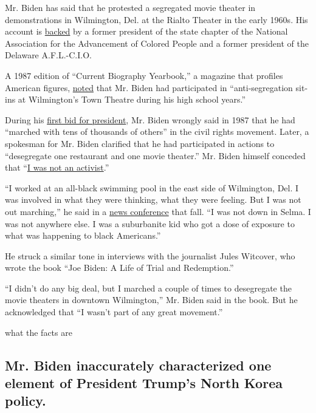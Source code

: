 Mr. Biden has said that he protested a segregated movie theater in
demonstrations in Wilmington, Del. at the Rialto Theater in the early
1960s. His account is
\href{https://blavity.com/op-ed-the-joe-we-know-and-why-we-continue-to-stand-by-him?category1=politics}{backed}
by a former president of the state chapter of the National Association
for the Advancement of Colored People and a former president of the
Delaware A.F.L.-C.I.O.

A 1987 edition of ``Current Biography Yearbook,'' a magazine that
profiles American figures,
\href{https://archive.org/stream/currentbiogr198700mori\#page/42}{noted}
that Mr. Biden had participated in ``anti-segregation sit-ins at
Wilmington's Town Theatre during his high school years.''

During his
\href{https://www.nytimes3xbfgragh.onion/2019/06/03/us/politics/biden-1988-presidential-campaign.html}{first
bid for president}, Mr. Biden wrongly said in 1987 that he had ``marched
with tens of thousands of others'' in the civil rights movement. Later,
a spokesman for Mr. Biden clarified that he had participated in actions
to ``desegregate one restaurant and one movie theater.'' Mr. Biden
himself conceded that
``\href{https://www.nytimes3xbfgragh.onion/1987/09/18/us/biden-admits-plagiarism-in-school-but-says-it-was-not-malevolent.html}{I
was not an activist}.''

``I worked at an all-black swimming pool in the east side of Wilmington,
Del. I was involved in what they were thinking, what they were feeling.
But I was not out marching,'' he said in a
\href{https://www.c-span.org/video/?c4803839/user-clip-biden-comments-marching-civil-rights-movement}{news
conference} that fall. ``I was not down in Selma. I was not anywhere
else. I was a suburbanite kid who got a dose of exposure to what was
happening to black Americans.''

He struck a similar tone in interviews with the journalist Jules
Witcover, who wrote the book ``Joe Biden: A Life of Trial and
Redemption.''

``I didn't do any big deal, but I marched a couple of times to
desegregate the movie theaters in downtown Wilmington,'' Mr. Biden said
in the book. But he acknowledged that ``I wasn't part of any great
movement.''

what the facts are

\hypertarget{mr-biden-inaccurately-characterized-one-element-of-president-trumps-north-korea-policy}{%
\subsection{Mr. Biden inaccurately characterized one element of
President Trump's North Korea
policy.}\label{mr-biden-inaccurately-characterized-one-element-of-president-trumps-north-korea-policy}}

